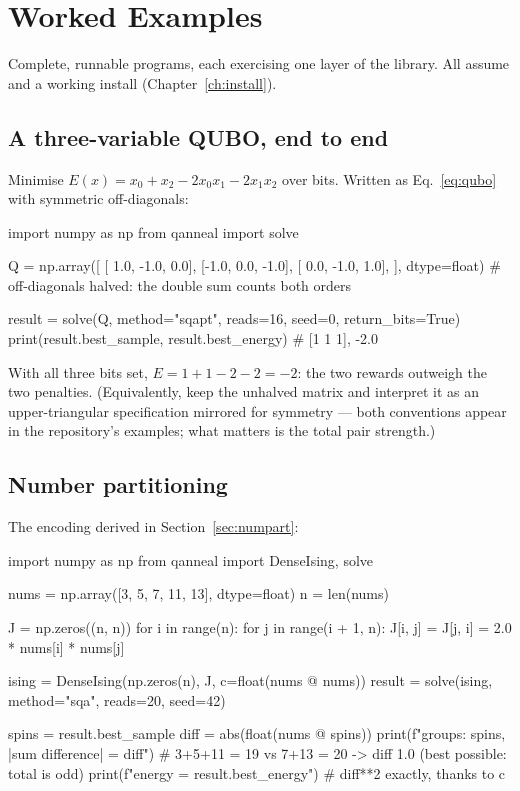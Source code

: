 \chapter{Worked Examples}
\label{ch:examples}

Complete, runnable programs, each exercising one layer of the library. All
assume  and a working install
(Chapter~\ref{ch:install}).

\section{A three-variable QUBO, end to end}

Minimise $E(x)=x_0+x_2-2x_0x_1-2x_1x_2$ over bits. Written as
Eq.~\eqref{eq:qubo} with symmetric off-diagonals:

\begin{pycode}
import numpy as np
from qanneal import solve

Q = np.array([
    [ 1.0, -1.0,  0.0],
    [-1.0,  0.0, -1.0],
    [ 0.0, -1.0,  1.0],
], dtype=float)      # off-diagonals halved: the double sum counts both orders

result = solve(Q, method="sqapt", reads=16, seed=0, return_bits=True)
print(result.best_sample, result.best_energy)   # [1 1 1], -2.0
\end{pycode}

With all three bits set, $E=1+1-2-2=-2$: the two rewards outweigh the two
penalties. (Equivalently, keep the unhalved matrix and interpret it as an
upper-triangular specification mirrored for symmetry --- both conventions
appear in the repository's examples; what matters is the total pair
strength.)

\section{Number partitioning}

The encoding derived in Section~\ref{sec:numpart}:

\begin{pycode}
import numpy as np
from qanneal import DenseIsing, solve

nums = np.array([3, 5, 7, 11, 13], dtype=float)
n = len(nums)

J = np.zeros((n, n))
for i in range(n):
    for j in range(i + 1, n):
        J[i, j] = J[j, i] = 2.0 * nums[i] * nums[j]

ising  = DenseIsing(np.zeros(n), J, c=float(nums @ nums))
result = solve(ising, method="sqa", reads=20, seed=42)

spins = result.best_sample
diff  = abs(float(nums @ spins))
print(f"groups: {spins},  |sum difference| = {diff}")
# 3+5+11 = 19 vs 7+13 = 20 -> diff 1.0 (best possible: total is odd)
print(f"energy = {result.best_energy}")   # diff**2 exactly, thanks to c
\end{pycode}

